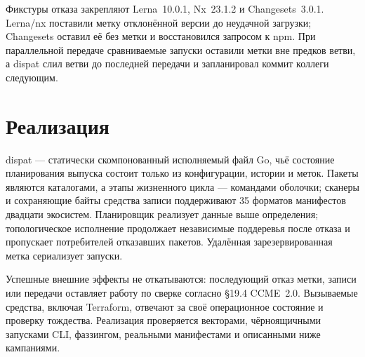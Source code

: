 \documentclass[sigconf,nonacm]{acmart}
\theoremstyle{acmplain}
\theoremstyle{acmdefinition}
\theoremstyle{acmplain}
\begin{document}
Фикстуры отказа закрепляют Lerna~10.0.1, Nx~23.1.2 и Changesets~3.0.1.
Lerna/nx поставили метку отклонённой версии до неудачной загрузки; Changesets
оставил её без метки и восстановился запросом к npm. При параллельной передаче
сравниваемые запуски оставили метки вне предков ветви, а dispat слил ветви до
последней передачи и запланировал коммит коллеги следующим.

\begin{table}[t]
\caption{Зафиксированные конфигурации средств выпуска.}
\label{tab:compare}
\scriptsize
{}
\end{table}
\section{Реализация}
\label{sec:impl}

dispat --- статически скомпонованный исполняемый файл Go, чьё состояние
планирования выпуска состоит только из конфигурации, истории и меток. Пакеты
являются каталогами, а этапы жизненного цикла --- командами оболочки;
сканеры и сохраняющие байты средства записи поддерживают 35 форматов
манифестов двадцати экосистем. Планировщик реализует данные выше определения;
топологическое исполнение продолжает независимые поддеревья после отказа и
пропускает потребителей отказавших пакетов. Удалённая зарезервированная метка
сериализует запуски.

Успешные внешние эффекты не откатываются: последующий отказ метки, записи или
передачи оставляет работу по сверке согласно \S19.4 CCME~2.0. Вызываемые
средства, включая Terraform, отвечают за своё операционное состояние и
проверку тождества. Реализация проверяется векторами, чёрноящичными запусками
CLI, фаззингом, реальными манифестами и описанными ниже кампаниями.
\end{document}
